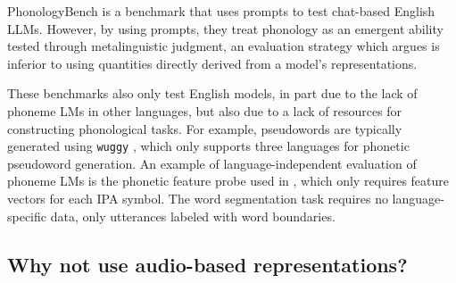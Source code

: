 PhonologyBench \citep{suvarna-etal-2024-phonologybench} is a benchmark that uses prompts to test chat-based English LLMs. However, by using prompts, they treat phonology as an emergent ability tested through metalinguistic judgment, an evaluation strategy which \citet{hu2023prompting} argues is inferior to using quantities directly derived from a model's representations.  

These benchmarks also only test English models, in part due to the lack of phoneme LMs in other languages, but also due to a lack of resources for constructing phonological tasks. For example, pseudowords are typically generated using \texttt{wuggy} \citep{keuleers2010wuggy}, which only supports three languages for phonetic pseudoword generation. An example of language-independent evaluation of phoneme LMs is the phonetic feature probe used in \citet{goriely2025}, which only requires feature vectors for each IPA symbol. The word segmentation task requires no language-specific data, only utterances labeled with word boundaries. 



\subsection{Why not use audio-based representations?}\label{sec:12-whynot}


